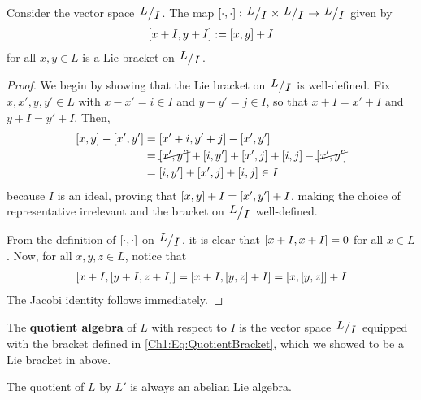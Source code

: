 \begin{boxproposition}\label{Ch1:Prop:QuotientAlgebraLieBracket}
    Consider the vector space $\quotient{L}{I}$. The map $\liebrac : \quotient{L}{I} \times \quotient{L}{I} \to \quotient{L}{I}$ given by
    \begin{align}
        \left[ x + I, y + I \right] := \left[ x, y \right] + I
        \label{Ch1:Eq:QuotientBracket}
    \end{align}
    for all $x, y \in L$ is a Lie bracket on $\quotient{L}{I}$.
\end{boxproposition}
\begin{proof}
    We begin by showing that the Lie bracket on $\quotient{L}{I}$ is well-defined. Fix $x, x', y, y' \in L$ with $x - x' = i \in I$ and $y - y' = j \in I$, so that $x + I = x' + I$ and $y + I = y' + I$. Then,
    \begin{align*}
        \left[ x, y \right] - \left[ x', y' \right]
        &= \left[ x' + i, y' + j \right] - \left[ x', y' \right] \\
        &= \cancel{\left[ x', y' \right]} + \left[ i, y' \right] + \left[ x', j \right] + \left[ i, j \right] - \cancel{\left[ x', y' \right]} \\
        &= \left[ i, y' \right] + \left[ x', j \right] + \left[ i, j \right] \in I
    \end{align*}
    because $I$ is an ideal, proving that $\left[ x, y \right] + I = \left[ x', y' \right] + I$, making the choice of representative irrelevant and the bracket on $\quotient{L}{I}$ well-defined.

    From the definition of $\left[ \cdot, \cdot \right]$ on $\quotient{L}{I}$, it is clear that $\left[ x + I, x + I \right] = 0$ for all $x \in L$. Now, for all $x, y, z \in L$, notice that
    \begin{align*}
        \left[ x + I, \left[ y + I, z + I \right] \right] = \left[ x + I, \left[ y, z \right] + I \right] = \left[ x, \left[ y, z \right] \right] + I
    \end{align*}
    The Jacobi identity follows immediately.
\end{proof}

\begin{boxdefinition}
    The \textbf{quotient algebra} of $L$ with respect to $I$ is the vector space $\quotient{L}{I}$ equipped with the bracket defined in \eqref{Ch1:Eq:QuotientBracket}, which we showed to be a Lie bracket in  above.
\end{boxdefinition}

\begin{boxexample}
    The quotient of $L$ by $L'$ is always an abelian Lie algebra.
\end{boxexample}

